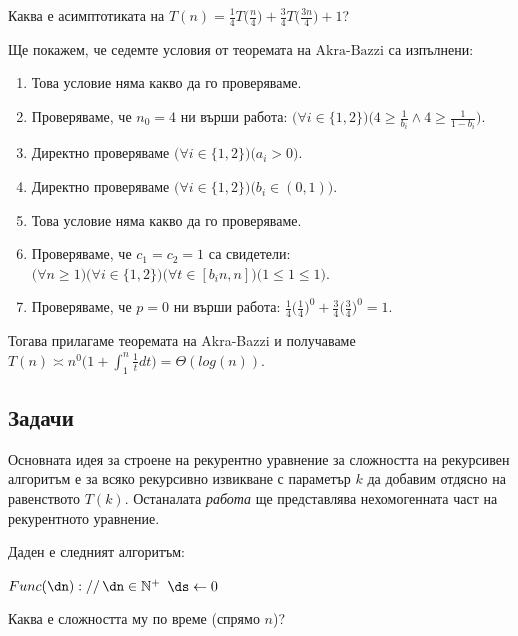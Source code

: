 \begin{problem}
Каква е асимптотиката на $T(n)=\frac14T\big(\frac n4\big)+\frac34T\big(\frac{3n}4\big)+1$? 
\end{problem}

\begin{solution}
	Ще покажем, че седемте условия от $\hyperref[th:akra-bazzi]{\text{теоремата на Akra-Bazzi}}$ са изпълнени:
	\begin{enumerate}
		\item Това условие няма какво да го проверяваме.
		\vspace{-0.15cm}
		\item Проверяваме, че $n_0=4$ ни върши работа: $\big(\forall i\in\{1,2\}\big)\Big(4\ge\frac1{b_i}\land 4\ge\frac1{1-b_i}\Big)$.
		\vspace{-0.15cm}
		\item Директно проверяваме $\big(\forall i\in\{1,2\}\big)\big(a_i>0\big)$.
		\item Директно проверяваме $\big(\forall i\in\{1,2\}\big)\big(b_i\in(0,1)\big)$.
		\item Това условие няма какво да го проверяваме.
		\item Проверяваме, че $c_1\!=\!c_2\!=\!1$ са свидетели: $\big(\forall n\!\ge\!1\big)\big(\forall i\!\in\!\{1,2\}\big)\big(\forall t\!\in\![b_in,n]\big)\big(1\!\le\!1\!\le\!1\big)$.
		\item Проверяваме, че $p=0$ ни върши работа: $\frac14\big(\frac14\big)^0+\frac34\big(\frac34\big)^0=1$.
	\end{enumerate}
	\vspace{-0.2cm}
	Тогава прилагаме теоремата на Akra-Bazzi и получаваме $T(n)\asymp n^0\bigg(1+\displaystyle\int_1^n\frac1tdt\bigg)=\Theta(log(n))$.
\end{solution}\leavevmode\newline


\subsection{Задачи}

Основната идея за строене на рекурентно уравнение за сложността на рекурсивен алгоритъм е за всяко рекурсивно извикване с параметър $k$ да добавим отдясно на равенството $T(k)$. Останалата \emph{работа} ще представлява нехомогенната част на рекурентното уравнение.\\

\begin{problem}
	Даден е следният алгоритъм:
	\begin{pseudocode}
		
		
		$Func(\dn)://\,\dn\in\mathbb{N}^+$
		\Mybegin
		{
			$\ds\leftarrow0$\;
			\KwRet{$\ds$}\;
		}
	\end{pseudocode}
	Каква е сложността му по време (спрямо $n$)?
\end{problem}


